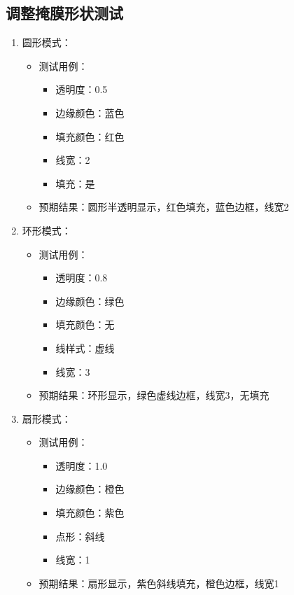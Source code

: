 \documentclass[a4paper,12pt]{report}	%
\begin{document}
\subsection{调整掩膜形状测试}

\begin{enumerate}
    \item 圆形模式：
    \begin{itemize}
        \item 测试用例：
        \begin{itemize}
            \item 透明度：0.5
            \item 边缘颜色：蓝色
            \item 填充颜色：红色
            \item 线宽：2
            \item 填充：是
        \end{itemize}
        \item 预期结果：圆形半透明显示，红色填充，蓝色边框，线宽2
    \end{itemize}
    
    \item 环形模式：
    \begin{itemize}
        \item 测试用例：
        \begin{itemize}
            \item 透明度：0.8
            \item 边缘颜色：绿色
            \item 填充颜色：无
            \item 线样式：虚线
            \item 线宽：3
        \end{itemize}
        \item 预期结果：环形显示，绿色虚线边框，线宽3，无填充
    \end{itemize}
    
    \item 扇形模式：
    \begin{itemize}
        \item 测试用例：
        \begin{itemize}
            \item 透明度：1.0
            \item 边缘颜色：橙色
            \item 填充颜色：紫色
            \item 点形：斜线
            \item 线宽：1
        \end{itemize}
        \item 预期结果：扇形显示，紫色斜线填充，橙色边框，线宽1
    \end{itemize}
    

\end{enumerate}
\end{document}
